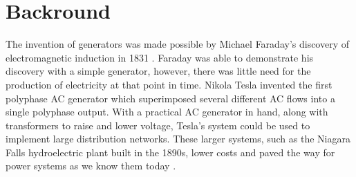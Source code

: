 \section{Backround}
The invention of generators was made possible by Michael Faraday's discovery of electromagnetic induction in 1831 \cite{faraday}. Faraday was able to demonstrate his discovery with a simple generator, however, there was little need for the production of electricity at that point in time. Nikola Tesla invented the first polyphase AC generator which superimposed several different AC flows into a single polyphase output. With a practical AC generator in hand, along with transformers to raise and lower voltage, Tesla's system could be used to implement large distribution networks. These larger systems, such as the Niagara Falls hydroelectric plant built in the 1890s, lower costs and paved the way for power systems as we know them today \cite{generators}.


